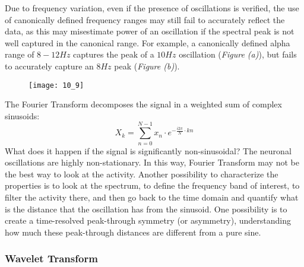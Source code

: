 \par\medskip
Due to frequency variation, even if the presence of oscillations is verified, the use of canonically defined frequency ranges may still fail to accurately reflect the 
data, as this may misestimate power of an oscillation if the spectral peak is not well captured in the canonical range. For example, a canonically defined alpha range 
of \(8-12 Hz\) captures the peak of a \(10 Hz\) oscillation (\textit{Figure (a)}), but fails to accurately capture an \(8 Hz\) peak (\textit{Figure (b)}).
\begin{figure}[H]
    \texttt{[image: 10\_9]}
    \centering
\end{figure}
The Fourier Transform decomposes the signal in a weighted sum of complex sinusoids:
\begin{equation*}
    X_k=\sum_{n=0}^{N-1} x_n\cdot e^{-\frac{i2\pi}{N}\cdot kn}
\end{equation*}
What does it happen if the signal is significantly non-sinusoidal? The neuronal oscillations are highly non-stationary. In this way, Fourier Transform may not 
be the best way to look at the activity. Another possibility to characterize the properties is to look at the spectrum, to define the frequency band of interest, to filter 
the activity there, and then go back to the time domain and quantify what is the distance that the oscillation has from the sinusoid. One possibility is to create a time-resolved 
peak-through symmetry (or asymmetry), understanding how much these peak-through distances are different from a pure sine.

\subsubsection{Wavelet Transform}